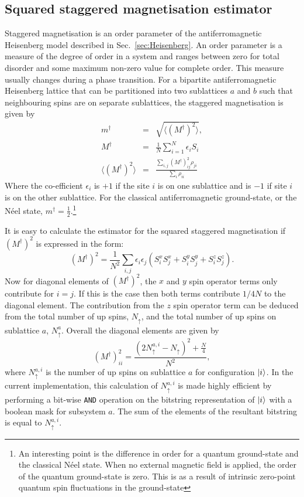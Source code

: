 \subsection{Squared staggered magnetisation estimator}
\label{sec:stagMagEstimator}
Staggered magnetisation is an order parameter of the antiferromagnetic Heisenberg model described in Sec.~\ref{sec:Heisenberg}. An order parameter is a measure of the degree of order in a system and ranges between zero for total disorder and some maximum non-zero value for complete order. This measure usually changes during a phase transition. For a bipartite antiferromagnetic Heisenberg lattice that can be partitioned into two sublattices $a$ and $b$ such that neighbouring spins are on separate sublattices, the staggered magnetisation is given by\cite{Runge1992a}
\begin{eqnarray}
m^{\dagger} &=& \sqrt{\langle (M^{\dagger})^2 \rangle}, \\
M^{\dagger} &= &\frac{1}{N}\sum_{i=1}^N \epsilon_i S_i\\
\langle (M^{\dagger})^2 \rangle &=&\frac{\sum_{i,j}( M^{\dagger})^2_{ij} \rho_{ji}}{\sum_i\rho_{ii}}\label{eq:numeratorStaggered}
\end{eqnarray}
Where the co-efficient $\epsilon_i$ is $+1$ if the site $i$ is on one sublattice and is $-1$ if site $i$ is on the other sublattice. For the classical antiferromagnetic ground-state, or the N\'eel state, $m^{\dagger} = \frac{1}{2}$.\footnote{An interesting point is the difference in order for a quantum ground-state and the classical N\'eel state. When no external magnetic field is applied, the order of the quantum ground-state is zero\cite{Brink}. This is as a result of intrinsic zero-point quantum spin fluctuations in the ground-state\cite{Henley2007}}

It is easy to calculate the estimator for the squared staggered magnetisation if $(M^{\dagger})^2$ is expressed in the form:
\begin{equation}
(M^{\dagger})^2 = \frac{1}{N^2}\sum_{i,j} \epsilon_{i} \epsilon_{j} (S_i^xS_j^x + S_i^yS_j^y + S_i^zS_j^z).
\end{equation}
Now for diagonal elements of $(M^{\dagger})^2$, the $x$ and $y$ spin operator terms only contribute for $i = j$. If this is the case then both terms contribute $1/4N$ to the diagonal element. The contribution from the $z$ spin operator term can be deduced from the total number of up spins, $N_{\uparrow}$, and the total number of up spins on sublattice $a$, $N_{\uparrow}^a$. Overall the diagonal elements are given by 
\begin{equation}
(M^{\dagger})^2_{ii} = \frac{(2N_{\uparrow}^{a,i}-N_{\uparrow})^2 + \frac{N}{4}}{N^2},
\end{equation}
where $N_{\uparrow}^{a,i}$ is the number of up spins on sublattice $a$ for configuration $\ket{i}$. In the current implementation, this calculation of $N_{\uparrow}^{a,i}$ is made highly efficient by performing a bit-wise \texttt{AND} operation on the bitstring representation of $\ket{i}$ with a boolean mask for subsystem $a$. The sum of the elements of the resultant bitstring is equal to $N_{\uparrow}^{a,i}$.

